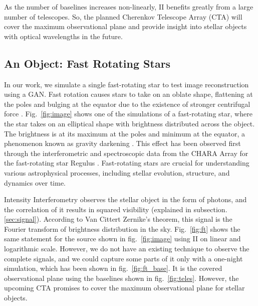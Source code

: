 As the number of baselines increases non-linearly, II benefits greatly from a large number of telescopes. So, the planned Cherenkov Telescope Array (CTA) will cover the maximum observational plane and provide insight into stellar objects with optical wavelengths in the future.

\subsection{An Object: Fast Rotating Stars}
In our work, we simulate a single fast-rotating star to test image reconstruction using a GAN. Fast rotation causes stars to take on an oblate shape, flattening at the poles and bulging at the equator due to the existence of stronger centrifugal force \cite{von1924radiative, 1999A&A...347..185M}. Fig.~\ref{fig:image} shows one of the simulations of a fast-rotating star, where the star takes on an elliptical shape with brightness distributed across the object. The brightness is at its maximum at the poles and minimum at the equator, a phenomenon known as gravity darkening \cite{lucy1967gravity}. This effect has been observed first through the interferometric and spectroscopic data from the CHARA Array for the fast-rotating star Regulus \cite{mcalister2005first}. Fast-rotating stars are crucial for understanding various astrophysical processes, including stellar evolution, structure, and dynamics over time.

Intensity Interferometry observes the stellar object in the form of photons, and the correlation of it results in squared visibility (explained in subsection.\ref{sec:signal}). According to Van Cittert Zernike's theorem, this signal is the Fourier transform of brightness distribution in the sky. Fig.~\ref {fig:ft} shows the same statement for the source shown in fig.~\ref{fig:image} using II on linear and logarithmic scale. However, we do not have an existing technique to observe the complete signals, and we could capture some parts of it only with a one-night simulation, which has been shown in fig.~\ref{fig:ft_base}. It is the covered observational plane using the baselines shown in fig.~\ref{fig:teles}. However, the upcoming CTA promises to cover the maximum observational plane for stellar objects.